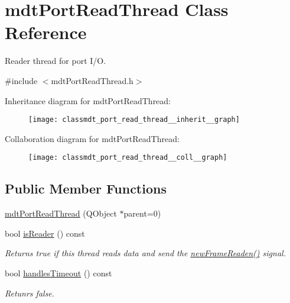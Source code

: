 \hypertarget{classmdt_port_read_thread}{\section{mdt\-Port\-Read\-Thread Class Reference}
\label{classmdt_port_read_thread}
}


Reader thread for port I/\-O.  




{\ttfamily \#include $<$mdt\-Port\-Read\-Thread.\-h$>$}



Inheritance diagram for mdt\-Port\-Read\-Thread\-:\nopagebreak
\begin{figure}[H]
\begin{center}
\leavevmode
\texttt{[image: classmdt\_port\_read\_thread\_\_inherit\_\_graph]}
\end{center}
\end{figure}


Collaboration diagram for mdt\-Port\-Read\-Thread\-:\nopagebreak
\begin{figure}[H]
\begin{center}
\leavevmode
\texttt{[image: classmdt\_port\_read\_thread\_\_coll\_\_graph]}
\end{center}
\end{figure}
\subsection*{Public Member Functions}
\begin{DoxyCompactItemize}
\item 
\hyperlink{classmdt_port_read_thread_a180074c2ff60f5103d7e3aa27c1cdb01}{mdt\-Port\-Read\-Thread} (Q\-Object $\ast$parent=0)
\item 
bool \hyperlink{classmdt_port_read_thread_a0138d613b61056c9f8373331de2d9a84}{is\-Reader} () const 
\begin{DoxyCompactList}\small\item\em Returns true if this thread reads data and send the \hyperlink{classmdt_port_thread_a7fc2245c753fd65e1beffec211c41461}{new\-Frame\-Readen()} signal. \end{DoxyCompactList}\item 
bool \hyperlink{classmdt_port_read_thread_afa42f86f3fed878b8f44cacb3a2f41af}{handles\-Timeout} () const 
\begin{DoxyCompactList}\small\item\em Retunrs false. \end{DoxyCompactList}\end{DoxyCompactItemize}
